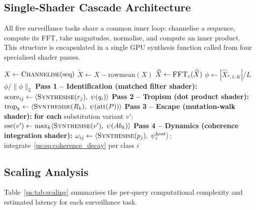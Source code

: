 \subsection{Single-Shader Cascade Architecture}

All five surveillance tasks share a common inner loop: channelise a sequence,
compute its FFT, take magnitudes, normalise, and compute an inner product. This
structure is encapsulated in a single GPU synthesis function called from four
specialised shader passes.

\begin{algorithm}
\caption{GPU fragment-shader surveillance pipeline}
\label{ps:alg:gpu}
\begin{algorithmic}[1]
  \State $X \gets \textsc{Channelise}(\text{seq})$
  \State $\widetilde{X} \gets X - \text{rowmean}(X)$
  \State $\widehat{X} \gets \textsc{FFT}_c(\widetilde{X})$
  \State $\phi \gets |\widehat{X}_{*,1:K}| / L$
  \State \Return $\phi / \|\phi\|_2$
\EndFunction
\Statex
\State \textbf{Pass 1 -- Identification (matched filter shader):}
\State \quad $\text{score}_{ij} \gets \langle \textsc{Synthesise}(r_j),\; \psi(q_i) \rangle$
\Statex
\State \textbf{Pass 2 -- Tropism (dot product shader):}
\State \quad $\text{trop}_{k} \gets \langle \textsc{Synthesise}(R_k),\; \psi(\text{att}(P)) \rangle$
\Statex
\State \textbf{Pass 3 -- Escape (mutation-walk shader):}
\State \quad \textbf{for each} substitution variant $v'$:
\State \qquad $\text{esc}(v') \gets \max_k \langle \textsc{Synthesise}(v'),\; \psi(Ab_k) \rangle$
\Statex
\State \textbf{Pass 4 -- Dynamics (coherence integration shader):}
\State \quad $\omega_{ij} \gets \langle \textsc{Synthesise}(p_j),\; \psi_i^{\text{host}} \rangle$;
  integrate~\eqref{ps:eq:coherence_decay} per class $i$
\end{algorithmic}
\end{algorithm}

\subsection{Scaling Analysis}

Table~\ref{ps:tab:scaling} summarises the per-query computational complexity and
estimated latency for each surveillance task.

